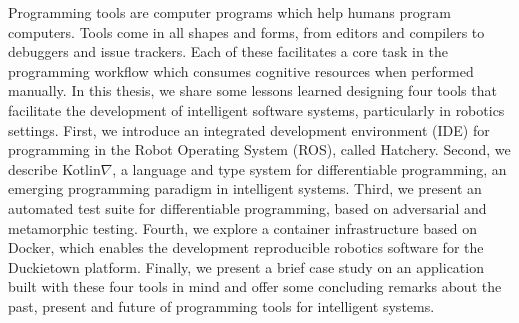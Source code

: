 \documentclass[12pt,initial,twoside,maitrise]{dms}
\numberwithin{equation}{section}
\numberwithin{table}{chapter}
\numberwithin{figure}{chapter}
\begin{document}
Programming tools are computer programs which help humans program computers. Tools come in all shapes and forms, from editors and compilers to debuggers and issue trackers. Each of these facilitates a core task in the programming workflow which consumes cognitive resources when performed manually. In this thesis, we share some lessons learned designing four tools that facilitate the development of intelligent software systems, particularly in robotics settings. First, we introduce an integrated development environment (IDE) for programming in the Robot Operating System (ROS), called Hatchery. Second, we describe Kotlin$\nabla$, a language and type system for differentiable programming, an emerging programming paradigm in intelligent systems. Third, we present an automated test suite for differentiable programming, based on adversarial and metamorphic testing. Fourth, we explore a container infrastructure based on Docker, which enables the development reproducible robotics software for the Duckietown platform. Finally, we present a brief case study on an application built with these four tools in mind and offer some concluding remarks about the past, present and future of programming tools for intelligent systems.
\end{document}

